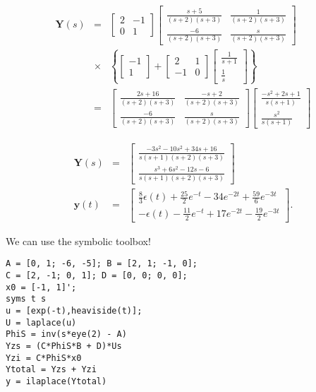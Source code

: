 \begin{eqnarray*} \mathbf{Y}(s)&=&
\left[\begin{array}{cc}
  2 & -1 \\
  0 & 1
\end{array}\right]
\left[\begin{array}{cc}
  \frac{s+5}{(s+2)(s+3)} & \frac{1}{(s+2)(s+3)} \\
  \frac{-6}{(s+2)(s+3)} & \frac{s}{(s+2)(s+3)}
\end{array}\right]\\
&\times& \left\{\left[\begin{array}{c}
  -1 \\
  1
\end{array}\right]+\left[\begin{array}{cc}
  2 & 1 \\
  -1 & 0
\end{array}\right]\left[\begin{array}{c}
  \frac{1}{s+1} \\
  \frac{1}{s}
\end{array}\right]\right\}\\
&=& \left[\begin{array}{cc}
  \frac{2s+16}{(s+2)(s+3)} & \frac{-s+2}{(s+2)(s+3)} \\
  \frac{-6}{(s+2)(s+3)} & \frac{s}{(s+2)(s+3)}
\end{array}\right]\left[\begin{array}{c}
  \frac{-s^2+2s+1}{s(s+1)} \\
  \frac{s^2}{s(s+1)}
\end{array}\right]
\end{eqnarray*}

\begin{eqnarray*}
\mathbf{Y}(s)&=& \left[\begin{array}{c}
  \frac{-3s^2-10s^2+34s+16}{s(s+1)(s+2)(s+3)} \\
  \frac{s^3+6s^2-12s-6}{s(s+1)(s+2)(s+3)}
\end{array}\right]\\
\mathbf{y}(t)&=& \left[\begin{array}{c}
  \frac{8}{3}\epsilon(t)+\frac{25}{2}e^{-t}-34e^{-2t}+\frac{59}{6}e^{-3t} \\
   -\epsilon(t)-\frac{11}{2}e^{-t}+17e^{-2t}-\frac{19}{2}e^{-3t}
\end{array}\right].
\end{eqnarray*}

\begin{slide}
We can use the symbolic toolbox!
\begin{verbatim}
A = [0, 1; -6, -5]; B = [2, 1; -1, 0];
C = [2, -1; 0, 1]; D = [0, 0; 0, 0];
x0 = [-1, 1]';
syms t s
u = [exp(-t),heaviside(t)];
U = laplace(u)
PhiS = inv(s*eye(2) - A)
Yzs = (C*PhiS*B + D)*Us
Yzi = C*PhiS*x0
Ytotal = Yzs + Yzi
y = ilaplace(Ytotal)
\end{verbatim}
\end{slide}

